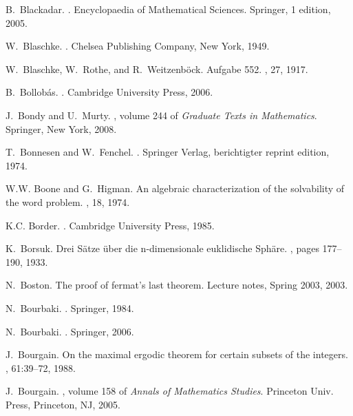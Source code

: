 \documentclass[12pt]{amsart}
\begin{document}
\begin{thebibliography}{100}
B.~Blackadar.
.
\newblock Encyclopaedia of Mathematical Sciences. Springer, 1 edition, 2005.

W.~Blaschke.
.
\newblock Chelsea Publishing Company, New York, 1949.

W.~Blaschke, W.~Rothe, and R.~Weitzenb{\"o}ck.
\newblock Aufgabe 552.
, 27, 1917.

B.~Bollob\'as.
.
\newblock Cambridge University Press, 2006.

J.~Bondy and U.~Murty.
, volume 244 of {\em Graduate Texts in
  Mathematics}.
\newblock Springer, New York, 2008.

T.~Bonnesen and W.~Fenchel.
.
\newblock Springer Verlag, berichtigter reprint edition, 1974.

W.W. Boone and G.~Higman.
\newblock An algebraic characterization of the solvability of the word problem.
, 18, 1974.

K.C. Border.
.
\newblock Cambridge University Press, 1985.

K.~Borsuk.
\newblock Drei {S\"a}tze {\"uber} die n-dimensionale euklidische {Sph\"are}.
, pages 177--190, 1933.

N.~Boston.
\newblock The proof of fermat's last theorem.
\newblock Lecture notes, Spring 2003, 2003.

N.~Bourbaki.
.
\newblock Springer, 1984.

N.~Bourbaki.
.
\newblock Springer, 2006.

J.~Bourgain.
\newblock On the maximal ergodic theorem for certain subsets of the integers.
, 61:39--72, 1988.

J.~Bourgain.
, volume 158 of {\em Annals of Mathematics Studies}.
\newblock Princeton Univ. Press, Princeton, NJ, 2005.


\end{thebibliography}
\end{document}
